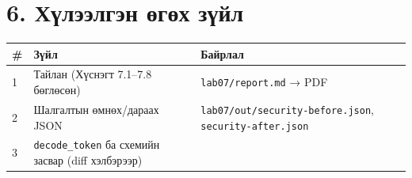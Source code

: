 \hypertarget{ux445ux4afux43bux44dux44dux43bux433ux44dux43d-ux4e9ux433ux4e9ux445-ux437ux4afux439ux43b}{%
\section{6. Хүлээлгэн өгөх зүйл}\label{ux445ux4afux43bux44dux44dux43bux433ux44dux43d-ux4e9ux433ux4e9ux445-ux437ux4afux439ux43b}}

\begingroup\scriptsize\begin{longtable}[]{@{}lll@{}}
\toprule
\begin{minipage}[b]{0.30\columnwidth}\raggedright
\#\strut
\end{minipage} & \begin{minipage}[b]{0.30\columnwidth}\raggedright
Зүйл\strut
\end{minipage} & \begin{minipage}[b]{0.30\columnwidth}\raggedright
Байрлал\strut
\end{minipage}\tabularnewline
\midrule
\endhead
\begin{minipage}[t]{0.30\columnwidth}\raggedright
1\strut
\end{minipage} & \begin{minipage}[t]{0.30\columnwidth}\raggedright
Тайлан (Хүснэгт 7.1--7.8 бөглөсөн)\strut
\end{minipage} & \begin{minipage}[t]{0.30\columnwidth}\raggedright
\texttt{lab07/report.md} → PDF\strut
\end{minipage}\tabularnewline
\begin{minipage}[t]{0.30\columnwidth}\raggedright
2\strut
\end{minipage} & \begin{minipage}[t]{0.30\columnwidth}\raggedright
Шалгалтын өмнөх/дараах JSON\strut
\end{minipage} & \begin{minipage}[t]{0.30\columnwidth}\raggedright
\texttt{lab07/\allowbreak{}out/\allowbreak{}security-before.\allowbreak{}json}, \texttt{security-after.\allowbreak{}json}\strut
\end{minipage}\tabularnewline
\begin{minipage}[t]{0.30\columnwidth}\raggedright
3\strut
\end{minipage} & \begin{minipage}[t]{0.30\columnwidth}\raggedright
\texttt{decode\_token} ба схемийн засвар (diff хэлбэрээр)\strut
\end{minipage} & \begin{minipage}[t]{0.30\columnwidth}\raggedright

\end{minipage}
\end{longtable}
